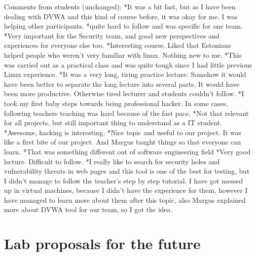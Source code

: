  Comments from students (unchanged): 
*It was a bit fast, but as I have been dealing with DVWA and this kind of course before, it was okay for me. I was helping other participants. 
*quite hard to follow and was specific for one team. 
*Very important for the Security team, and good new perspectives and experiences for everyone else too. 
*Interesting course. Liked that Estonians helped people who weren’t very familiar with linux. Nothing new to me. 
*This was carried out as a practical class and was quite tough since I had little previous Linux experience. 
*It was a very long, tiring practice lecture. Somehow it would have been better to separate the long lecture into several parts. It would have been more productive. Otherwise tired lecturer and students couldn’t follow.  
*I took my first baby steps towards being professional hacker. In some cases, following teachers teaching was hard because of the fast pace. 
*Not that relevant for all projects, but still important thing to understand as a IT student. 
*Awesome, hacking is interesting. 
*Nice topic and useful to our project. It was like a first bite of our project. And Margus taught things so that everyone can learn.
*That was something different out of software engineering field 
*Very good lecture. Difficult to follow. 
*I really like to search for security holes and vulnerability threats in web pages and this tool is one of the best for testing, but I didn't manage to follow the teacher's step by step tutorial. I have got messed up in virtual machines, because I didn't have the experience for them, however I have managed to learn more about them after this topic, also Margus explained more about DVWA tool for our team, so I got the idea.

\chapter{Lab proposals for the future}
\label{Appendix:Lab proposals for the future}

